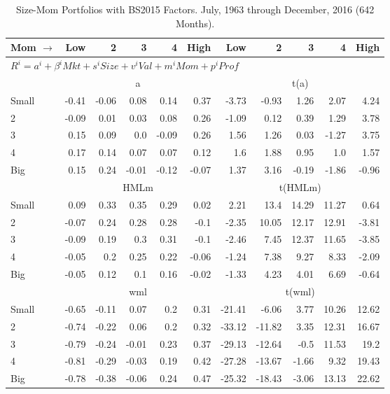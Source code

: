 
\begin{table}[!ht]
\centering
\caption{Size-Mom Portfolios with BS2015 Factors. \footnotesize{July, 1963 through December, 2016 (642 Months).}}
\begin{tabular}{lrrrrrrrrrr}
  \toprule
  Mom $\rightarrow$ & Low & 2 & 3 & 4 & High & Low & 2 & 3 & 4 & High \\ 
  \toprule
  \multicolumn{9}{l}{$R^i=a^i+\beta^iMkt+s^iSize+v^iVal+m^iMom+p^iProf$} \\

  

      & \multicolumn{5}{c}{a} & \multicolumn{5}{c}{t(a)} \\
    \cmidrule(r){2-6} \cmidrule(r){7-11}
      Small  & -0.41  & -0.06  & 0.08  & 0.14  & 0.37   & -3.73  & -0.93  & 1.26  & 2.07  & 4.24  \\
          2  & -0.09  & 0.01  & 0.03  & 0.08  & 0.26   & -1.09  & 0.12  & 0.39  & 1.29  & 3.78  \\
          3  & 0.15  & 0.09  & 0.0  & -0.09  & 0.26   & 1.56  & 1.26  & 0.03  & -1.27  & 3.75  \\
          4  & 0.17  & 0.14  & 0.07  & 0.07  & 0.12   & 1.6  & 1.88  & 0.95  & 1.0  & 1.57  \\
      Big    & 0.15  & 0.24  & -0.01  & -0.12  & -0.07   & 1.37  & 3.16  & -0.19  & -1.86  & -0.96  \\


      & \multicolumn{5}{c}{HMLm} & \multicolumn{5}{c}{t(HMLm)} \\
    \cmidrule(r){2-6} \cmidrule(r){7-11}
      Small  & 0.09  & 0.33  & 0.35  & 0.29  & 0.02   & 2.21  & 13.4  & 14.29  & 11.27  & 0.64  \\
          2  & -0.07  & 0.24  & 0.28  & 0.28  & -0.1   & -2.35  & 10.05  & 12.17  & 12.91  & -3.81  \\
          3  & -0.09  & 0.19  & 0.3  & 0.31  & -0.1   & -2.46  & 7.45  & 12.37  & 11.65  & -3.85  \\
          4  & -0.05  & 0.2  & 0.25  & 0.22  & -0.06   & -1.24  & 7.38  & 9.27  & 8.33  & -2.09  \\
      Big    & -0.05  & 0.12  & 0.1  & 0.16  & -0.02   & -1.33  & 4.23  & 4.01  & 6.69  & -0.64  \\

  

      & \multicolumn{5}{c}{wml} & \multicolumn{5}{c}{t(wml)} \\
    \cmidrule(r){2-6} \cmidrule(r){7-11}
      Small  & -0.65  & -0.11  & 0.07  & 0.2  & 0.31   & -21.41  & -6.06  & 3.77  & 10.26  & 12.62  \\
          2  & -0.74  & -0.22  & 0.06  & 0.2  & 0.32   & -33.12  & -11.82  & 3.35  & 12.31  & 16.67  \\
          3  & -0.79  & -0.24  & -0.01  & 0.23  & 0.37   & -29.13  & -12.64  & -0.5  & 11.53  & 19.2  \\
          4  & -0.81  & -0.29  & -0.03  & 0.19  & 0.42   & -27.28  & -13.67  & -1.66  & 9.32  & 19.43  \\
      Big    & -0.78  & -0.38  & -0.06  & 0.24  & 0.47   & -25.32  & -18.43  & -3.06  & 13.13  & 22.62  \\


\end{tabular}
\end{table}
